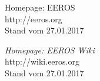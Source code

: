 \begin{thebibliography}{BA}

	 {Homepage: EEROS}
	\\http://eeros.org
	\\Stand vom 27.01.2017
	
	 \emph{Homepage: EEROS Wiki}
	\\http://wiki.eeros.org
	\\Stand vom 27.01.2017
	
\end{thebibliography}

